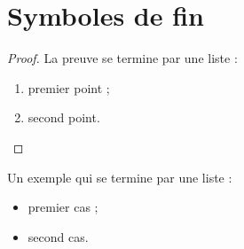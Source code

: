 \documentclass[11pt]{ocots-book}
\begin{document}
\mainmatter
\chapter{Symboles de fin}

\begin{proof}
    La preuve se termine par une liste :
    \begin{enumerate}
        \item premier point ;
        \item second point.
    \end{enumerate}
\end{proof}

\begin{example}
    Un exemple qui se termine par une liste :
    \begin{itemize}
        \item premier cas ;
        \item second cas.
    \end{itemize}
\end{example}
\end{document}
